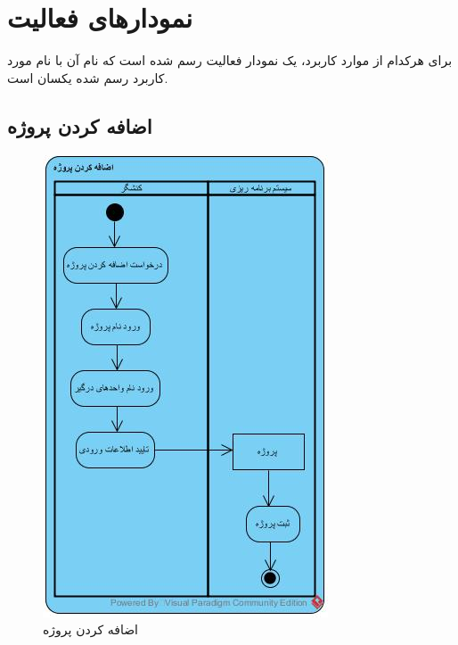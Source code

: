 \chapter{نمودارهای فعالیت}
برای هرکدام از موارد کاربرد، یک نمودار فعالیت رسم شده است که نام آن با نام مورد کاربرد رسم شده یکسان است.
\section{اضافه کردن پروژه}
\begin{figure}[H]
	\centering
	\includegraphics[scale=0.9]{img/activity/AddProjectToOrganization}
	\caption{اضافه کردن پروژه}
\end{figure}

